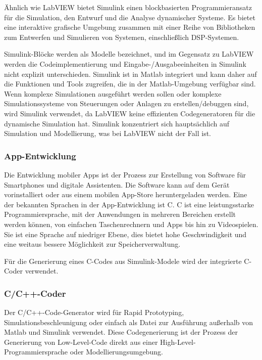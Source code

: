 Ähnlich wie LabVIEW bietet Simulink einen blockbasierten Programmieransatz für die Simulation, den Entwurf und die Analyse dynamischer Systeme. Es bietet eine interaktive grafische Umgebung zusammen mit einer Reihe von Bibliotheken zum Entwerfen und Simulieren von Systemen, einschließlich DSP-Systemen. 

Simulink-Blöcke werden als Modelle bezeichnet, und im Gegensatz zu LabVIEW werden die Codeimplementierung und Eingabe-/Ausgabeeinheiten in Simulink nicht explizit unterschieden. Simulink ist in Matlab integriert und kann daher auf die Funktionen und Tools zugreifen, die in der Matlab-Umgebung verfügbar sind. \citep{Kehtarnavaz2006} \citep{Cansalar2015}\\


Wenn komplexe Simulationen ausgeführt werden sollen oder komplexe Simulationssysteme von Steuerungen oder Anlagen zu erstellen/debuggen sind, wird Simulink verwendet, da LabVIEW keine effizienten Codegeneratoren für die dynamische Simulation hat.
Simulink konzentriert sich hauptsächlich auf Simulation und Modellierung, was bei LabVIEW nicht der Fall ist.


\subsubsection{App-Entwicklung}
Die Entwicklung mobiler Apps ist der Prozess zur Erstellung von Software für Smartphones und digitale Assistenten. Die Software kann auf dem Gerät vorinstalliert oder aus einem mobilen App-Store heruntergeladen werden. Eine der bekannten Sprachen in der App-Entwicklung ist C.
C ist eine leistungsstarke Programmiersprache, mit der Anwendungen in mehreren Bereichen erstellt werden können, von einfachen Taschenrechnern und Apps bis hin zu Videospielen. Sie ist eine Sprache auf niedriger Ebene, dies bietet hohe Geschwindigkeit und eine weitaus bessere Möglichkeit zur Speicherverwaltung.

Für die Generierung eines C-Codes aus Simulink-Modele wird der integrierte C-Coder verwendet.

\subsubsection{C/C++-Coder}
Der C/C++-Code-Generator wird für Rapid Prototyping, Simulationsbeschleunigung oder einfach als Datei zur Ausführung außerhalb von Matlab und Simulink verwendet.
Diese Codegenerierung ist der Prozess der Generierung von Low-Level-Code direkt aus einer High-Level-Programmiersprache oder Modellierungsumgebung.

